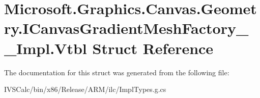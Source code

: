 \hypertarget{struct_microsoft_1_1_graphics_1_1_canvas_1_1_geometry_1_1_i_canvas_gradient_mesh_factory_____impl_1_1_vtbl}{}\section{Microsoft.\+Graphics.\+Canvas.\+Geometry.\+I\+Canvas\+Gradient\+Mesh\+Factory\+\_\+\+\_\+\+Impl.\+Vtbl Struct Reference}
\label{struct_microsoft_1_1_graphics_1_1_canvas_1_1_geometry_1_1_i_canvas_gradient_mesh_factory_____impl_1_1_vtbl}


The documentation for this struct was generated from the following file\+:\begin{DoxyCompactItemize}
\item 
I\+V\+S\+Calc/bin/x86/\+Release/\+A\+R\+M/ilc/Impl\+Types.\+g.\+cs\end{DoxyCompactItemize}

